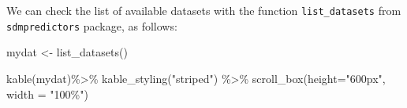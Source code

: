\documentclass[
]{book}
\newenvironment{Shaded}{\begin{snugshade}}{\end{snugshade}}
\newcommand{\AttributeTok}[1]{\textcolor[rgb]{0.77,0.63,0.00}{#1}}
\newcommand{\FunctionTok}[1]{\textcolor[rgb]{0.00,0.00,0.00}{#1}}
\newcommand{\NormalTok}[1]{#1}
\newcommand{\OtherTok}[1]{\textcolor[rgb]{0.56,0.35,0.01}{#1}}
\newcommand{\SpecialCharTok}[1]{\textcolor[rgb]{0.00,0.00,0.00}{#1}}
\newcommand{\StringTok}[1]{\textcolor[rgb]{0.31,0.60,0.02}{#1}}
\begin{document}
We can check the list of available datasets with the function \texttt{list\_datasets} from \texttt{sdmpredictors} package, as follows:

\begin{Shaded}
\begin{Highlighting}[]
\NormalTok{mydat }\OtherTok{\textless{}{-}} \FunctionTok{list\_datasets}\NormalTok{()}

\FunctionTok{kable}\NormalTok{(mydat)}\SpecialCharTok{\%\textgreater{}\%} 
  \FunctionTok{kable\_styling}\NormalTok{(}\StringTok{"striped"}\NormalTok{) }\SpecialCharTok{\%\textgreater{}\%} 
  \FunctionTok{scroll\_box}\NormalTok{(}\AttributeTok{height=}\StringTok{"600px"}\NormalTok{, }\AttributeTok{width =} \StringTok{"100\%"}\NormalTok{)}
\end{Highlighting}
\end{Shaded}
\end{document}
